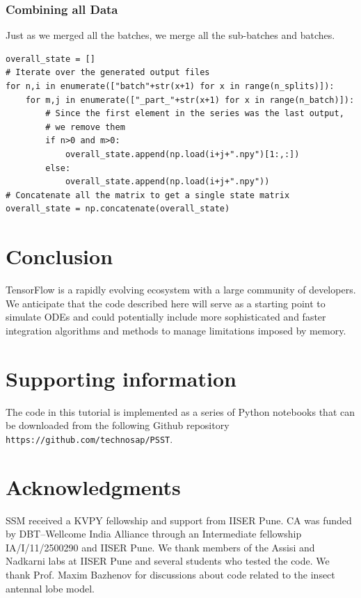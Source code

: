 \documentclass[10pt,letterpaper]{article}
\begin{document}
\begin{nolinenumbers}
\subsubsection*{Combining all Data}
Just as we merged all the batches, we merge all the sub-batches and batches.

\begin{verbatim}
overall_state = []
# Iterate over the generated output files
for n,i in enumerate(["batch"+str(x+1) for x in range(n_splits)]):
    for m,j in enumerate(["_part_"+str(x+1) for x in range(n_batch)]):
        # Since the first element in the series was the last output, 
        # we remove them
        if n>0 and m>0:
            overall_state.append(np.load(i+j+".npy")[1:,:])
        else:
            overall_state.append(np.load(i+j+".npy"))
# Concatenate all the matrix to get a single state matrix
overall_state = np.concatenate(overall_state)
\end{verbatim}

\section*{Conclusion}
TensorFlow is a rapidly evolving ecosystem with a large community of developers. We anticipate that the code described here will serve as a starting point to simulate ODEs and could potentially include more sophisticated and faster integration algorithms and methods to manage limitations imposed by memory. 

\section*{Supporting information}
The code in this tutorial is implemented as a series of Python notebooks that can be downloaded from the following Github repository \texttt{https://github.com/technosap/PSST}. 
\section*{Acknowledgments}
SSM received a KVPY fellowship and support from IISER Pune. CA was funded by DBT–Wellcome India Alliance through an Intermediate fellowship IA/I/11/2500290 and IISER Pune. We thank members of the Assisi and Nadkarni labs at IISER Pune and several students who tested the code.  We thank Prof. Maxim Bazhenov for discussions about code related to the insect antennal lobe model.

\nolinenumbers



\end{nolinenumbers}
\end{document}
